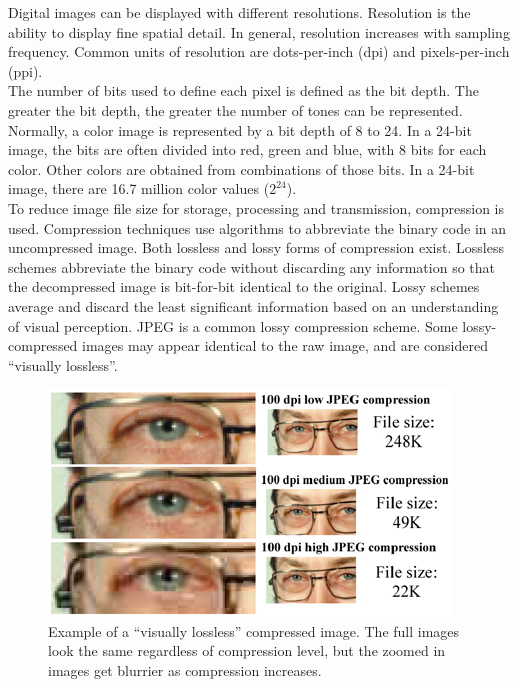 \documentclass{article}
\begin{document}
\noindent Digital images can be displayed with different resolutions.  Resolution is the ability to display fine spatial detail.  In general, resolution increases with sampling frequency.  Common units of resolution are dots-per-inch (dpi) and pixels-per-inch (ppi).   \\ 

\noindent The number of bits used to define each pixel is defined as the bit depth.  The greater the bit depth, the greater the number of tones can be represented.  Normally, a color image is represented by a bit depth of 8 to 24.  In a 24-bit image, the bits are often divided into red, green and blue, with 8 bits for each color.  Other colors are obtained from combinations of those bits.  In a 24-bit image, there are 16.7 million color values ($2^{24}$).  	\\ 

\noindent To reduce image file size for storage, processing and transmission, compression is used.  Compression techniques use algorithms to abbreviate the binary code in an uncompressed image.  Both lossless and lossy forms of compression exist. Lossless schemes abbreviate the binary code without discarding any information so that the decompressed image is bit-for-bit identical to the original.  Lossy schemes average and discard the least significant information based on an understanding of visual perception.  JPEG is a common lossy compression scheme.  Some lossy-compressed images may appear identical to the raw image, and are considered ``visually lossless''.  \cite{cornell} 

\begin{figure}[H]
      			\centering
      			\includegraphics[scale=0.75]{./images/research_image_processing_2}
			\caption{Example of a ``visually lossless'' compressed image.  The full images look the same regardless of compression level, but the zoomed in images get blurrier as compression increases.}
			\label{fig:research_image_processing_2}
   		 \end{figure}
\end{document}
